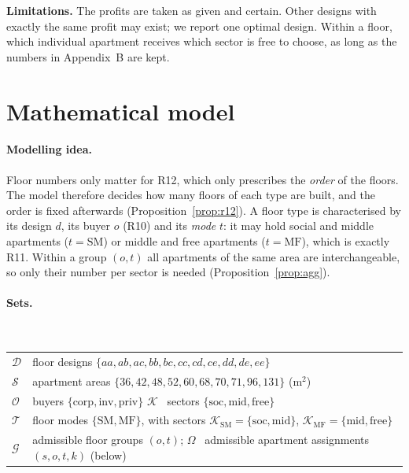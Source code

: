 \documentclass[11pt,a4paper]{article}
\newcommand{\Dset}{\mathcal{D}}
\newcommand{\Sset}{\mathcal{S}}
\newcommand{\Oset}{\mathcal{O}}
\newcommand{\Kset}{\mathcal{K}}
\newcommand{\Tset}{\mathcal{T}}
\newcommand{\Gset}{\mathcal{G}}
\newcommand{\soc}{\text{soc}}
\newcommand{\midd}{\text{mid}}
\newcommand{\fre}{\text{free}}
\newcommand{\inv}{\text{inv}}
\newcommand{\cor}{\text{corp}}
\begin{document}
\textbf{Limitations.} The profits are taken as given and certain. Other
designs with exactly the same profit may exist; we report one optimal design. Within a
floor, which individual apartment receives which sector is free to choose, as
long as the numbers in Appendix~B are kept.

\clearpage
\appendix
\section{Mathematical model}

\paragraph{Modelling idea.} Floor numbers only matter for R12, which only
prescribes the \emph{order} of the floors. The model therefore decides how many
floors of each type are built, and the order is fixed afterwards
(Proposition~\ref{prop:r12}). A floor type is characterised by its design $d$,
its buyer $o$ (R10) and its \emph{mode} $t$: it may hold social and middle
apartments ($t=\text{SM}$) or middle and free apartments ($t=\text{MF}$), which is
exactly R11. Within a group $(o,t)$ all apartments of the same area are
interchangeable, so only their number per sector is needed
(Proposition~\ref{prop:agg}).

\paragraph{Sets.}\ \\[-12pt]
\begin{center}
\begin{tabular}{@{}l p{13cm}@{}}
$\Dset$ & floor designs $\{aa, ab, ac, bb, bc, cc, cd, ce, dd, de, ee\}$ \\
$\Sset$ & apartment areas $\{36,42,48,52,60,68,70,71,96,131\}$ (m$^2$) \\
$\Oset$ & buyers $\{\cor, \inv, \text{priv}\}$ \qquad $\Kset$ \ sectors $\{\soc, \midd, \fre\}$ \\
$\Tset$ & floor modes $\{\text{SM}, \text{MF}\}$, with sectors $\Kset_{\text{SM}}=\{\soc,\midd\}$, $\Kset_{\text{MF}}=\{\midd,\fre\}$ \\
$\Gset$ & admissible floor groups $(o,t)$; \quad $\Omega$ \ admissible apartment assignments $(s,o,t,k)$ (below)
\end{tabular}
\end{center}
\end{document}
